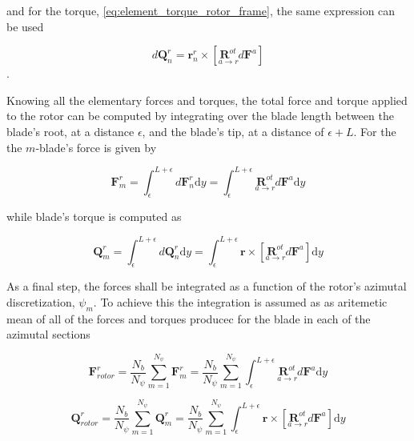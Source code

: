 and for the torque, \ref{eq:element_torque_rotor_frame}, the same expression can be used

\begin{equation}
    d\mathbf{Q}^r_n = \mathbf{r}^r_n \times \left[ \underset{a \to r}{\boldsymbol{R}^{ot}}  d\mathbf{F}^a \right] 
    \label{eq:element_torque_rotor_frame_simplified}
\end{equation}.

Knowing all the elementary forces and torques, the total force and torque applied to the rotor can be computed by integrating over the blade length between the blade's root, at a distance $\epsilon$, and the blade's tip, at a distance of $\epsilon + L$. For the the $m$-blade's force is given by

\begin{equation}
    \mathbf{F}^r_{m} = \int_\epsilon^{L+\epsilon} d\mathbf{F}^r_n \mathrm{d}y = \int_\epsilon^{L+\epsilon} \underset{a \to r}{\boldsymbol{R}^{ot}}  d\mathbf{F}^a \mathrm{d}y
\end{equation}


while blade's torque is computed as

\begin{equation}
    \mathbf{Q}^r_{m} = \int_\epsilon^{L+\epsilon} d\mathbf{Q}^r_n  \mathrm{d}y = \int_\epsilon^{L+\epsilon} \mathbf{r} \times \left[ \underset{a \to r}{\boldsymbol{R}^{ot}}  d\mathbf{F}^a \right] \mathrm{d}y
\end{equation}

As a final step, the forces shall be integrated as a function of the rotor's azimutal discretization, $\psi_m$. To achieve this the integration is assumed as as aritemetic mean of all of the forces and torques producec for the blade in each of the azimutal sections

\begin{equation}
    \mathbf{F}_{rotor}^r = \frac{N_b }{N_{\psi}} \sum_{m=1}^{N_{\psi}} \mathbf{F}^r_{m} = \frac{N_b }{N_{\psi}} \sum_{m=1}^{N_{\psi}} \int_\epsilon^{L+\epsilon} \underset{a \to r}{\boldsymbol{R}^{ot}}  d\mathbf{F}^a \mathrm{d}y
    \label{eq:total_rotor_force_rotor_frame}
\end{equation}

\begin{equation}
    \mathbf{Q}_{rotor}^r = \frac{N_b }{N_{\psi}} \sum_{m=1}^{N_{\psi}} \mathbf{Q}^r_{m} = \frac{N_b }{N_{\psi}} \sum_{m=1}^{N_{\psi}} \int_\epsilon^{L+\epsilon} \mathbf{r} \times \left[ \underset{a \to r}{\boldsymbol{R}^{ot}}  d\mathbf{F}^a \right] \mathrm{d}y
    \label{eq:total_rotor_torque_rotor_frame}
\end{equation}


